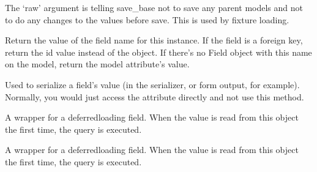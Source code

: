 \documentclass[letterpaper,10pt,english]{sphinxmanual}
\begin{document}
\begin{fulllineitems}
\begin{fulllineitems}
\sphinxAtStartPar
The ‘raw’ argument is telling save\_base not to save any parent
models and not to do any changes to the values before save. This
is used by fixture loading.

\end{fulllineitems}


\begin{fulllineitems}
\label{\detokenize{tasks:tasks.models.Task.serializable_value}}
\pysigstartsignatures
{}
\pysigstopsignatures
\sphinxAtStartPar
Return the value of the field name for this instance. If the field is
a foreign key, return the id value instead of the object. If there’s
no Field object with this name on the model, return the model
attribute’s value.

\sphinxAtStartPar
Used to serialize a field’s value (in the serializer, or form output,
for example). Normally, you would just access the attribute directly
and not use this method.

\end{fulllineitems}


\begin{fulllineitems}
\label{\detokenize{tasks:tasks.models.Task.status}}
\pysigstartsignatures
{}
\pysigstopsignatures
\sphinxAtStartPar
A wrapper for a deferred\sphinxhyphen{}loading field. When the value is read from this
object the first time, the query is executed.

\end{fulllineitems}


\begin{fulllineitems}
\label{\detokenize{tasks:tasks.models.Task.title}}
\pysigstartsignatures
{}
\pysigstopsignatures
\sphinxAtStartPar
A wrapper for a deferred\sphinxhyphen{}loading field. When the value is read from this
object the first time, the query is executed.

\end{fulllineitems}


\end{fulllineitems}
\end{document}
